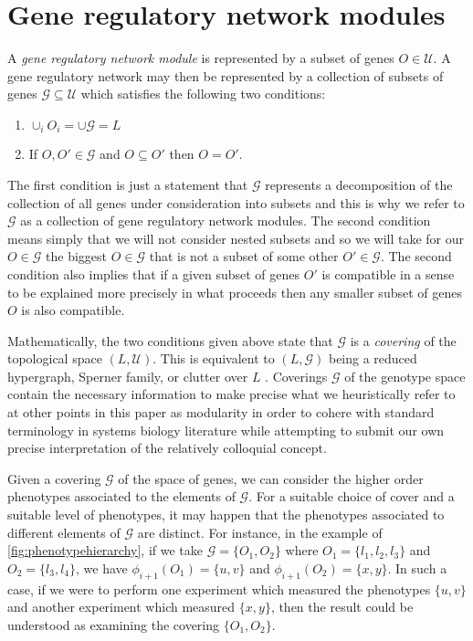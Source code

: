 \section{Gene regulatory network modules}\label{sec:covergenotypespace}
A \emph{gene regulatory network module} is represented by a subset of genes $O \in \mathcal{U}$. A gene regulatory network may then be represented by a collection of subsets of genes $\mathcal{G} \subseteq \mathcal{U}$ which satisfies the following two conditions:
\begin{enumerate}
\item $\cup_i O_i = \cup \mathcal{G} = L$
\item If $O,O' \in \mathcal{G}$ and $O \subseteq O'$ then $O = O'$.
\end{enumerate}
The first condition is just a statement that $\mathcal{G}$ represents a decomposition of the collection of all genes under consideration into subsets and this is why we refer to $\mathcal{G}$ as a collection of gene regulatory network modules. The second condition means simply that we will not consider nested subsets and so we will take for our $O \in \mathcal{G}$ the biggest $O \in \mathcal{G}$ that is not a subset of some other $O' \in \mathcal{G}$. The second condition also implies that if a given subset of genes $O'$ is compatible in a sense to be explained more precisely in what proceeds then any smaller subset of genes $O$ is also compatible.

Mathematically, the two conditions given above state that $\mathcal{G}$ is a \emph{covering} of the topological space $(L, \mathcal {U})$.  This is equivalent to $(L, \mathcal{G})$ being a reduced hypergraph, Sperner family, or clutter over $L$ \cite{Lauritzen1996}.  Coverings $\mathcal{G}$ of the genotype space contain the necessary information to make precise what we heuristically refer to at other points in this paper as modularity in order to cohere with standard terminology in systems biology literature while attempting to submit our own precise interpretation of the relatively colloquial concept.

Given a covering $\mathcal{G}$ of the space of genes, we can consider the higher order phenotypes associated to the elements of $\mathcal{G}$.  For a suitable choice of cover and a suitable level of phenotypes, it may happen that the phenotypes associated to different elements of $\mathcal{G}$ are distinct.  For instance, in the example of \ref{fig:phenotypehierarchy}, if we take $\mathcal{G} = \{O_1, O_2\}$ where $O_1 = \{l_1, l_2, l_3\}$ and $O_2 = \{l_3, l_4\}$, we have $\phi_{i+1}(O_1) = \{u,v\}$ and $\phi_{i+1}(O_2) = \{x,y\}$.  In such a case, if we were to perform one experiment which measured the phenotypes $\{u,v\}$ and another experiment which measured $\{x,y\}$, then the result could be understood as examining the covering $\{O_1, O_2\}$.

